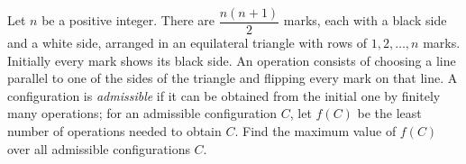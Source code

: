 Let $n$ be a positive integer. There are $\dfrac{n(n+1)}{2}$ marks, each with a black side and a white side, arranged in an equilateral triangle with rows of $1,2,\dots,n$ marks. Initially every mark shows its black side. An operation consists of choosing a line parallel to one of the sides of the triangle and flipping every mark on that line. A configuration is \emph{admissible} if it can be obtained from the initial one by finitely many operations; for an admissible configuration $C$, let $f(C)$ be the least number of operations needed to obtain $C$. Find the maximum value of $f(C)$ over all admissible configurations $C$.

